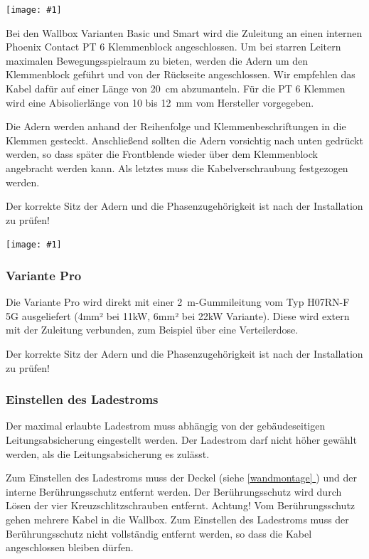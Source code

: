 \documentclass[a4paper,10pt]{article}
\newcommand{\gfx}[1]{\texttt{[image: \#1]}}
\newcommand*{\fullref}[1]{\hyperref[{#1}]{\ref*{#1} \nameref*{#1}}}
\begin{document}
\begin{multicols*}{2}
	\gfx{./img/resized/warp_cable_cut_ready}

	Bei den Wallbox Varianten Basic und Smart
	wird die Zuleitung an einen internen Phoenix Contact PT 6 Klemmenblock
	angeschlossen. Um bei starren Leitern maximalen Bewegungsspielraum zu bieten,
	werden die Adern um den Klemmenblock geführt und von der Rückseite
	angeschlossen. Wir empfehlen das Kabel dafür auf einer Länge von
	\SI{20}{\centi\meter} abzumanteln. Für die PT 6 Klemmen wird eine
	Abisolierlänge von 10 bis \SI{12}{\milli\meter} vom Hersteller vorgegeben.

	Die Adern werden anhand der Reihenfolge und Klemmenbeschriftungen in die
	Klemmen gesteckt. Anschließend sollten die Adern vorsichtig nach unten gedrückt
	werden, so dass später die Frontblende wieder über dem Klemmenblock angebracht
	werden kann.  Als letztes muss die Kabelverschraubung festgezogen werden.

	Der korrekte Sitz der Adern und die Phasenzugehörigkeit ist nach der
	Installation zu prüfen!

	\gfx{./img/resized/warp_wire_ready}

	\subsubsection{Variante Pro}
	Die Variante Pro wird direkt mit einer \SI{2}{\meter}-Gummileitung vom
	Typ H07RN-F 5G ausgeliefert (4mm² bei 11kW, 6mm² bei 22kW Variante). 
	Diese wird extern mit der Zuleitung verbunden, zum
	Beispiel über eine Verteilerdose.

	Der korrekte Sitz der Adern und die Phasenzugehörigkeit ist nach der
	Installation zu prüfen!

	\subsubsection{Einstellen des Ladestroms}
	Der maximal erlaubte Ladestrom muss abhängig von der gebäudeseitigen
	Leitungsabsicherung eingestellt werden. Der Ladestrom darf nicht höher gewählt
	werden, als die Leitungsabsicherung es zulässt.

	Zum Einstellen des Ladestroms muss der Deckel (siehe \fullref{wandmontage})
	und der interne Berührungsschutz entfernt werden. Der Berührungsschutz wird
	durch Lösen der vier Kreuzschlitzschrauben entfernt. Achtung! Vom
	Berührungsschutz gehen mehrere Kabel in die Wallbox. Zum Einstellen des
	Ladestroms muss der Berührungsschutz nicht vollständig entfernt werden,
	so dass die Kabel angeschlossen bleiben dürfen.


\end{multicols*}
\end{document}
